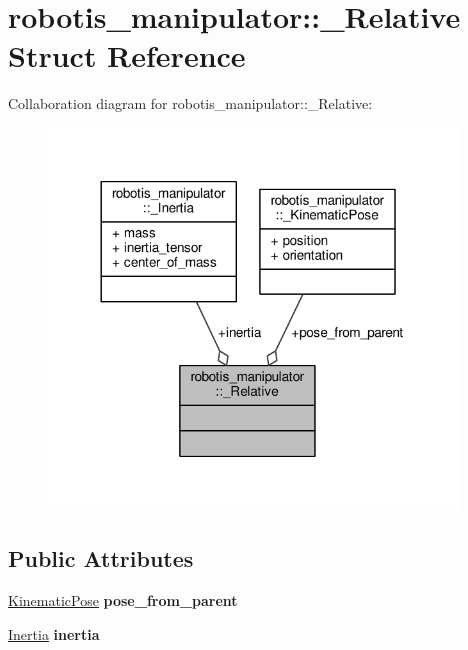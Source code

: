 \hypertarget{structrobotis__manipulator_1_1___relative}{}\section{robotis\+\_\+manipulator\+:\+:\+\_\+\+Relative Struct Reference}
\label{structrobotis__manipulator_1_1___relative}


Collaboration diagram for robotis\+\_\+manipulator\+:\+:\+\_\+\+Relative\+:
\nopagebreak
\begin{figure}[H]
\begin{center}
\leavevmode
\includegraphics[width=308pt]{structrobotis__manipulator_1_1___relative__coll__graph}
\end{center}
\end{figure}
\subsection*{Public Attributes}
\begin{DoxyCompactItemize}
\item 
\hyperlink{structrobotis__manipulator_1_1___kinematic_pose}{Kinematic\+Pose} {\bfseries pose\+\_\+from\+\_\+parent}\hypertarget{structrobotis__manipulator_1_1___relative_abe95187e192b20fda90ae3f2a4ba1ded}{}\label{structrobotis__manipulator_1_1___relative_abe95187e192b20fda90ae3f2a4ba1ded}

\item 
\hyperlink{structrobotis__manipulator_1_1___inertia}{Inertia} {\bfseries inertia}\hypertarget{structrobotis__manipulator_1_1___relative_a68d4520e9db5b57ed016e280a2abb615}{}\label{structrobotis__manipulator_1_1___relative_a68d4520e9db5b57ed016e280a2abb615}

\end{DoxyCompactItemize}


